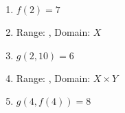 \begin{enumerate}[label=\textbf{\alph*.}]
	\item $ f(2) = 7 $
	\item Range: , Domain: $X$
	\item $ g(2,10) = 6 $
	\item Range: , Domain: $ X \times Y $
	\item $ g(4,f(4)) = 8$
\end{enumerate}